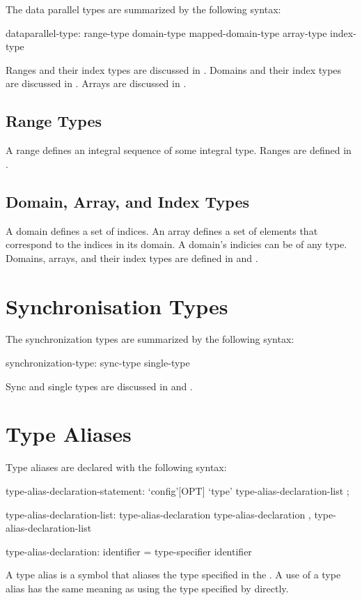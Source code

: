 The data parallel types are summarized by the following syntax:

\begin{syntax}
dataparallel-type:
  range-type
  domain-type
  mapped-domain-type
  array-type
  index-type
\end{syntax}

Ranges and their index types are discussed in .
Domains and their index types are discussed in .
Arrays are discussed in .

\subsection{Range Types}

A range defines an integral sequence of some integral type.  Ranges
are defined in .

\subsection{Domain, Array, and Index Types}
\label{Domain_and_Array_Types}

A domain defines a set of indices. An array defines a set of
elements that correspond to the indices in its domain.
A domain's indicies can be of any type.
Domains, arrays, and their index
types are defined in  and .

\section{Synchronisation Types}
\label{Synchronisation_Types}

The synchronization types are summarized by the following syntax:

\begin{syntax}
synchronization-type:
  sync-type
  single-type
\end{syntax}

Sync and single types are discussed in 
and .

\section{Type Aliases}
\label{Type_Aliases}

Type aliases are declared with the following syntax:
\begin{syntax}
type-alias-declaration-statement:
  `config'[OPT] `type' type-alias-declaration-list ;

type-alias-declaration-list:
  type-alias-declaration
  type-alias-declaration , type-alias-declaration-list

type-alias-declaration:
  identifier = type-specifier
  identifier
\end{syntax}
A type alias is a symbol that aliases the type specified in the
.  A use of a type alias has the same meaning as using
the type specified by  directly.

